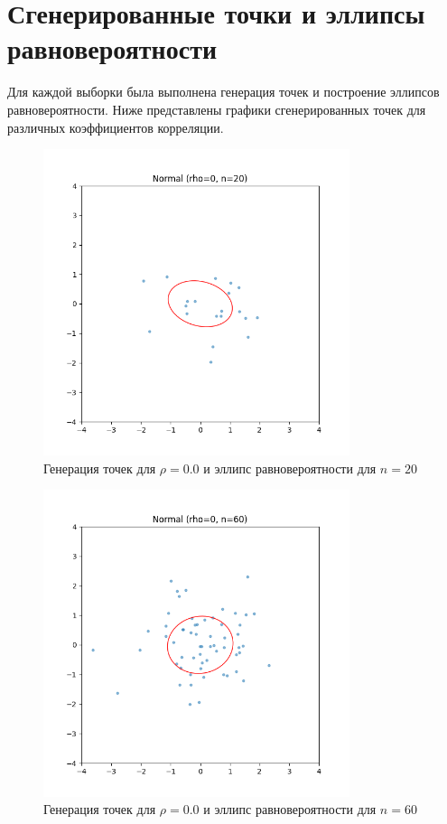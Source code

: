 \documentclass[a4paper]{article}
\begin{document}
    \section{Сгенерированные точки и эллипсы равновероятности}\label{sec:scatterplots}
    Для каждой выборки была выполнена генерация точек и построение эллипсов равновероятности. Ниже представлены графики сгенерированных точек для различных коэффициентов корреляции.

    \begin{figure}[H]
        \centering
        \includegraphics[width=0.8\textwidth]{./plots/normal_rho0_n20}
        \caption{Генерация точек для $\rho = 0.0$ и эллипс равновероятности для $n=20$}
        \label{fig:normal_rho0_n20}
    \end{figure}

    \begin{figure}[H]
        \centering
        \includegraphics[width=0.8\textwidth]{./plots/normal_rho0_n60}
        \caption{Генерация точек для $\rho = 0.0$ и эллипс равновероятности для $n=60$}
        \label{fig:normal_rho0_n60}
    \end{figure}
\end{document}
